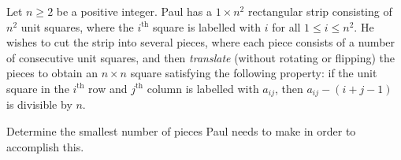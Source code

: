 Let $n \geq 2$ be a positive integer. Paul has a $1 \times n^2$ rectangular strip consisting of $n^2$ unit squares, where the $i^{\text{th}}$ square is labelled with $i$ for all $1 \leq i \leq n^2$. He wishes to cut the strip into several pieces, where each piece consists of a number of consecutive unit squares, and then \emph{translate} (without rotating or flipping) the pieces to obtain an $n \times n$ square satisfying the following property: if the unit square in the $i^{\text{th}}$ row and $j^{\text{th}}$ column is labelled with $a_{ij}$, then $a_{ij} - (i + j - 1)$ is divisible by $n$.

Determine the smallest number of pieces Paul needs to make in order to accomplish this.
